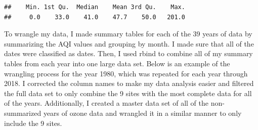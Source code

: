 \documentclass[12pt,]{article}
\newenvironment{Shaded}{\begin{snugshade}}{\end{snugshade}}
\newcommand{\KeywordTok}[1]{\textcolor[rgb]{0.13,0.29,0.53}{\textbf{#1}}}
\newcommand{\DecValTok}[1]{\textcolor[rgb]{0.00,0.00,0.81}{#1}}
\newcommand{\OperatorTok}[1]{\textcolor[rgb]{0.81,0.36,0.00}{\textbf{#1}}}
\newcommand{\NormalTok}[1]{#1}
\begin{document}
\begin{Shaded}
\end{Shaded}

\begin{verbatim}
##    Min. 1st Qu.  Median    Mean 3rd Qu.    Max. 
##     0.0    33.0    41.0    47.7    50.0   201.0
\end{verbatim}

To wrangle my data, I made summary tables for each of the 39 years of
data by summarizing the AQI values and grouping by month. I made sure
that all of the dates were classified as dates. Then, I used rbind to
combine all of my summary tables from each year into one large data set.
Below is an example of the wrangling process for the year 1980, which
was repeated for each year through 2018. I corrected the column names to
make my data analysis easier and filtered the full data set to only
combine the 9 sites with the most complete data for all of the years.
Additionally, I created a master data set of all of the non-summarized
years of ozone data and wrangled it in a similar manner to only include
the 9 sites.
\end{document}
